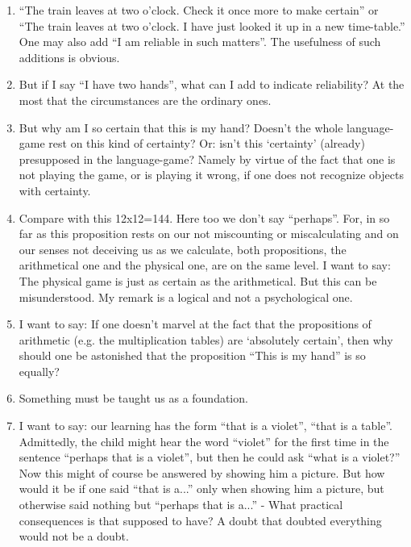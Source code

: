 \documentclass{book}
\begin{document}
\begin{enumerate}
\item
``The train leaves at two o'clock. Check it once more to make certain'' or
``The train leaves at two o'clock. I have just looked it up in a new
time-table.'' One may also add ``I am reliable in such matters''. The
usefulness of such additions is obvious.

\item
But if I say ``I have two hands'', what can I add to indicate reliability? At
the most that the circumstances are the ordinary ones.

\item
But why am I so certain that this is my hand? Doesn't the whole language-game
rest on this kind of certainty?  Or: isn't this `certainty' (already)
presupposed in the language-game? Namely by virtue of the fact that one is not
playing the game, or is playing it wrong, if one does not recognize objects
with certainty.

\item
Compare with this 12x12=144. Here too we don't say ``perhaps''. For, in so far
as this proposition rests on our not miscounting or miscalculating and on our
senses not deceiving us as we calculate, both propositions, the arithmetical
one and the physical one, are on the same level.  I want to say: The physical
game is just as certain as the arithmetical. But this can be misunderstood. My
remark is a logical and not a psychological one.

\item
I want to say: If one doesn't marvel at the fact that the propositions of
arithmetic (e.g. the multiplication tables) are `absolutely certain', then why
should one be astonished that the proposition ``This is my hand'' is so
equally?

\item
Something must be taught us as a foundation.

\item
I want to say: our learning has the form ``that is a violet'', ``that is a
table''. Admittedly, the child might hear the word ``violet'' for the first
time in the sentence ``perhaps that is a violet'', but then he could ask ``what
is a violet?'' Now this might of course be answered by showing him a picture.
But how would it be if one said ``that is a...'' only when showing him a
picture, but otherwise said nothing but ``perhaps that is a...'' - What
practical consequences is that supposed to have?  A doubt that doubted
everything would not be a doubt.


\end{enumerate}
\end{document}
